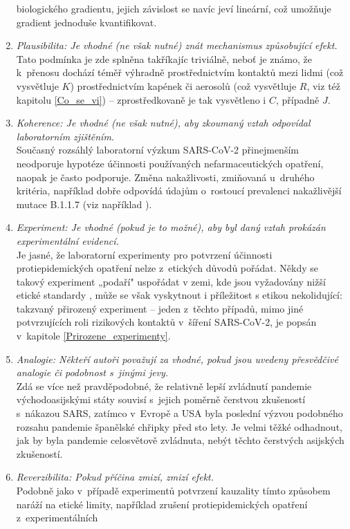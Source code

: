 \begin{enumerate}
biologického gradientu, jejich závislost se navíc jeví lineární, což umožňuje gradient jednoduše kvantifikovat.
\item \emph{Plausibilita: Je vhodné (ne však nutné) znát mechanismus způsobující
efekt.} \\
Tato podmínka je zde splněna takříkajíc triviálně, neboť je známo,
že k~přenosu dochází téměř výhradně prostřednictvím kontaktů mezi lidmi
(což vysvětluje $K$) prostřednictvím kapének či aerosolů (což vysvětluje
$R$, viz též kapitolu \ref{Co_se_vi}) -- zprostředkovaně je tak vysvětleno i $C$, případně $J$.
\item \emph{Koherence: Je vhodné (ne však nutné), aby zkoumaný vztah odpovídal
laboratorním zjištěním.}\\
Současný rozsáhlý laboratorní výzkum SARS-CoV-2 přinejmenším neodporuje
hypotéze účinnosti používaných nefarmaceutických opatření, naopak
je často podporuje. Změna nakažlivosti, zmiňovaná u~druhého kritéria, například dobře odpovídá údajům o~rostoucí prevalenci nakažlivější mutace B.1.1.7 (viz například \cite{diana}).
\item \emph{Experiment: Je vhodné (pokud je to možné), aby byl daný vztah
prokázán experimentální evidencí.}\\
Je jasné, že laboratorní experimenty pro potvrzení účinnosti protiepidemických
opatření nelze z~etických důvodů pořádat. Někdy se takový experiment „po\-da\-ří" uspo\-řá\-dat v zemi, kde jsou vyžadovány nižší etické standardy \cite{abaluck2021impact}, může se však vyskytnout i příležitost s etikou nekolidující:
takzvaný přirozený experiment -- jeden z~těchto případů, mimo jiné potvrzujících
roli rizikových kontaktů v~šíření SARS-CoV-2, je popsán v~kapitole
\ref{Prirozene_experimenty}.
\item \emph{Analogie: Někteří autoři považují za vhodné, pokud jsou 
uvedeny přesvědčivé analogie či podobnost s~jinými jevy.}\\
Zdá se více než pravděpodobné, že relativně lepší zvládnutí pandemie
vý\-cho\-do\-asij\-ský\-mi státy souvisí s~jejich poměrně čerstvou zkušeností
s~nákazou SARS, zatímco v~Evropě a USA byla poslední 
výzvou podobného rozsahu pandemie španělské chřipky před sto lety. Je velmi těžké odhadnout,
jak by byla pandemie celosvětově zvládnuta, nebýt těchto čerstvých
asijských zkušeností.
\item \emph{Reverzibilita: Pokud příčina zmizí, zmizí efekt.}\\
Podobně jako v~případě experimentů potvrzení kauzality tímto způsobem
na\-rá\-ží na etické limity, například zrušení protiepidemických opatření z~ex\-pe\-ri\-men\-tál\-ních

\end{enumerate}
